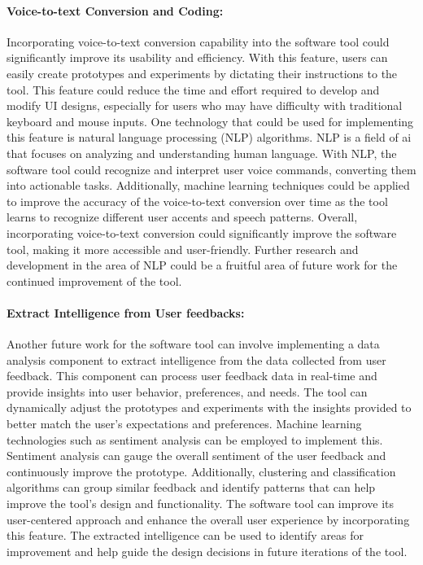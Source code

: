 \paragraph{Voice-to-text Conversion and Coding:}
Incorporating voice-to-text conversion capability into the software tool could significantly improve its usability and efficiency. 
With this feature, users can easily create prototypes and experiments by dictating their instructions to the tool. 
This feature could reduce the time and effort required to develop and modify UI designs, especially for users who may have difficulty with traditional keyboard and mouse inputs.
One technology that could be used for implementing this feature is natural language processing (NLP) algorithms. 
NLP is a field of \ac{ai} that focuses on analyzing and understanding human language. 
With NLP, the software tool could recognize and interpret user voice commands, converting them into actionable tasks. 
Additionally, machine learning techniques could be applied to improve the accuracy of the voice-to-text conversion over time as the tool learns to recognize different user accents and speech patterns.
Overall, incorporating voice-to-text conversion could significantly improve the software tool, making it more accessible and user-friendly. 
Further research and development in the area of NLP could be a fruitful area of future work for the continued improvement of the tool.

\paragraph{Extract Intelligence from User feedbacks:}
Another future work for the software tool can involve implementing a data analysis component to extract intelligence from the data collected from user feedback. 
This component can process user feedback data in real-time and provide insights into user behavior, preferences, and needs. 
The tool can dynamically adjust the prototypes and experiments with the insights provided to better match the user's expectations and preferences.
Machine learning technologies such as sentiment analysis can be employed to implement this. 
Sentiment analysis can gauge the overall sentiment of the user feedback and continuously improve the prototype. 
Additionally, clustering and classification algorithms can group similar feedback and identify patterns that can help improve the tool's design and functionality.
The software tool can improve its user-centered approach and enhance the overall user experience by incorporating this feature. 
The extracted intelligence can be used to identify areas for improvement and help guide the design decisions in future iterations of the tool.

